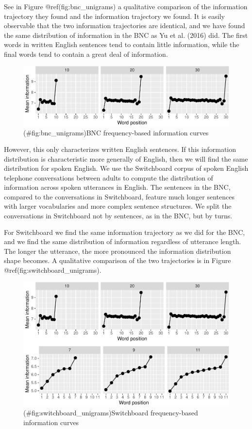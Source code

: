\documentclass[11pt,]{article}
\begin{document}
See in Figure @ref(fig:bnc\_unigrams) a qualitative comparison of the information trajectory they found and the information trajectory we found. It is easily observable that the two information trajectories are identical, and we have found the same distribution of information in the BNC as Yu et al. (2016) did. The first words in written English sentences tend to contain little information, while the final words tend to contain a great deal of information.

\begin{figure}
\centering
\includegraphics{paper_files/figure-latex/bnc_unigrams-1.pdf}
\caption{(\#fig:bnc\_unigrams)BNC frequency-based information curves}
\end{figure}

However, this only characterizes written English sentences. If this information distribution is characteristic more generally of English, then we will find the same distribution for spoken English. We use the Switchboard corpus of spoken English telephone conversations between adults to compute the distribution of information across spoken utterances in English. The sentences in the BNC, compared to the conversations in Switchboard, feature much longer sentences with larger vocabularies and more complex sentence structures. We split the conversations in Switchboard not by sentences, as in the BNC, but by turns.

For Switchboard we find the same information trajectory as we did for the BNC, and we find the same distribution of information regardless of utterance length. The longer the utterance, the more pronounced the information distribution shape becomes. A qualitative comparison of the two trajectories is in Figure @ref(fig:switchboard\_unigrams).

\begin{figure}
\centering
\includegraphics{paper_files/figure-latex/switchboard_unigrams-1.pdf}
\caption{(\#fig:switchboard\_unigrams)Switchboard frequency-based information curves}
\end{figure}
\end{document}
